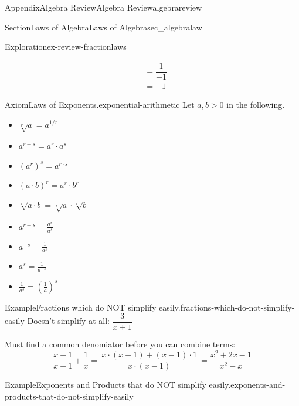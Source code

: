 \documentclass{tufte-book}
\numberwithin{equation}{chapter}
\newcommand{\amp}{&}
\begin{document}
\begin{appendixptx}{Appendix}{Algebra Review}{}{Algebra Review}{}{}{algebrareview}
\begin{sectionptx}{Section}{Laws of Algebra}{}{Laws of Algebra}{}{}{sec_algebralaw}
\begin{exploration}{Exploration}{}{ex-review-fractionlaws}
\begin{enumerate}[font=\bfseries,label=(\alph*),ref=\alph*]
\begin{align*}
\amp = \dfrac{1}{-1}\\
\amp = -1
\end{align*}
%
\end{enumerate}%
\end{exploration}%
\begin{axiom}{Axiom}{Laws of Exponents.}{}{exponential-arithmetic}%
Let \(a,b> 0\) in the following.%
\begin{sidebyside}{2}{0.1}{0.1}{0}%
\begin{sbspanel}{0.4}%
%
\begin{itemize}[label=$\circ$]
\item{}\(\displaystyle \sqrt[r]{a}=  a^{1/r}\)%
\item{}\(\displaystyle a^{r+s} =  a^r\cdot a^s \)%
\item{}\(\displaystyle {\left(a^{r}\right)}^s=  a^{r\cdot s}\)%
\item{}\(\displaystyle {\left(a\cdot b\right)}^{r}=  a^{r}\cdot b^{r}\)%
\item{}\(\displaystyle \sqrt[r]{a\cdot b}=  \sqrt[r]{a}\cdot \sqrt[r]{b}\)%
\end{itemize}
\end{sbspanel}%
\begin{sbspanel}{0.4}%
%
\begin{itemize}[label=$\circ$]
\item{}\(\displaystyle a^{r-s}=  \frac{a^r}{a^s}\)%
\item{}\(\displaystyle a^{-s}=  \frac{1}{a^s}\)%
\item{}\(\displaystyle a^{s}=  \frac{1}{a^{-s}}\)%
\item{}\(\displaystyle \frac{1}{a^{s}} =  \left(\frac{1}{a}\right)^s\)%
\end{itemize}
\end{sbspanel}%
\end{sidebyside}%
\end{axiom}
\begin{example}{Example}{Fractions which do NOT simplify easily.}{fractions-which-do-not-simplify-easily}%
Doesn't simplify at all: \(\dfrac{3}{x+1}\)%
\par
Must find a common denomiator before you can combine terms:%
\begin{equation*}
\dfrac{x+1}{x-1} + \dfrac{1}{x} = \dfrac{\,x\cdot (x+1) + (x-1)\cdot 1\,}{x\cdot (x-1)} = \dfrac{x^2+2x-1}{x^2-x}
\end{equation*}
%
\end{example}
\begin{example}{Example}{Exponents and Products that do NOT simplify easily.}{exponents-and-products-that-do-not-simplify-easily}%

\end{example}
\end{sectionptx}
\end{appendixptx}
\end{document}
